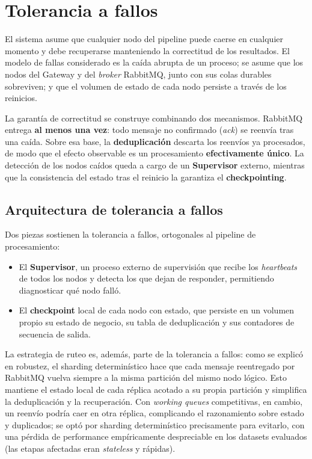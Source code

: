 \documentclass[12pt,a4paper]{article}
\begin{document}
\newpage
\section{Tolerancia a fallos}
El sistema asume que cualquier nodo del pipeline puede caerse en
cualquier momento y debe recuperarse manteniendo la correctitud de
los resultados. El modelo de fallas considerado es la caída abrupta
de un proceso; se asume que los nodos del Gateway y del
\textit{broker} RabbitMQ, junto con sus colas durables sobreviven; y
que el volumen de estado de cada nodo persiste a través de los reinicios.

La garantía de correctitud se construye combinando dos mecanismos.
RabbitMQ entrega \textbf{al menos una vez}: todo mensaje no confirmado
(\textit{ack}) se reenvía tras una caída. Sobre esa base, la
\textbf{deduplicación} descarta los reenvíos ya procesados, de modo que el
efecto observable es un procesamiento \textbf{efectivamente único}. La
detección de los nodos caídos queda a cargo de un \textbf{Supervisor}
externo, mientras que la consistencia del estado tras el reinicio la
garantiza el \textbf{checkpointing}.

\subsection{Arquitectura de tolerancia a fallos}
Dos piezas sostienen la tolerancia a fallos, ortogonales al pipeline de
procesamiento:

\begin{itemize}
    \item El \textbf{Supervisor}, un proceso externo de supervisión que recibe
        los \textit{heartbeats} de todos los nodos y detecta los que dejan de
        responder, permitiendo diagnosticar qué nodo falló.
    \item El \textbf{checkpoint} local de cada nodo con estado, que persiste
        en un volumen propio su estado de negocio, su tabla de deduplicación
        y sus contadores de secuencia de salida.
\end{itemize}

La estrategia de ruteo es, además, parte de la tolerancia a fallos:
como se explicó en robustez, el sharding determinístico hace que cada
mensaje reentregado por RabbitMQ vuelva siempre a la misma partición del
mismo nodo lógico. Esto mantiene el estado local de cada réplica acotado a
su propia partición y simplifica la deduplicación y la recuperación. Con
\textit{working queues} competitivas, en cambio, un reenvío podría caer en
otra réplica, complicando el razonamiento sobre estado y duplicados; se
optó por sharding determinístico precisamente para evitarlo, con una
pérdida de performance empíricamente despreciable en los datasets evaluados
(las etapas afectadas eran \textit{stateless} y rápidas).
\end{document}
